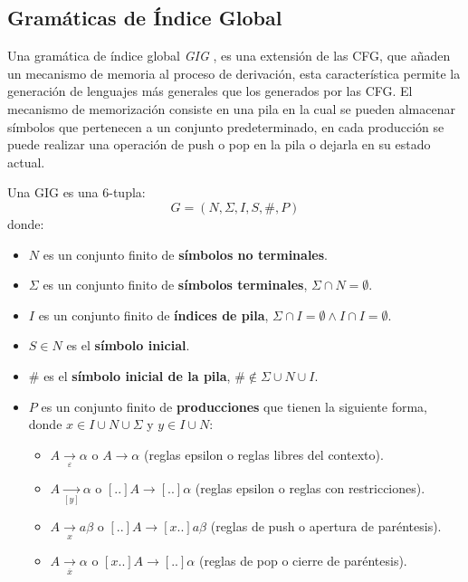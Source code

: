 \documentclass{article}
\begin{document}
\subsection{Gramáticas de Índice Global}

Una gramática de índice global \textit{GIG} \cite{globalIndexLanguages}, es una extensión de las CFG, que añaden un mecanismo 
de memoria al proceso de derivación, esta característica permite la generación de lenguajes más generales que los generados por las CFG.
El mecanismo de memorización consiste en una pila en la cual se pueden almacenar símbolos que pertenecen a un conjunto predeterminado,
en cada producción se puede realizar una operación de push o pop en la pila o dejarla en su estado actual.

Una GIG es una 6-tupla:
$$
      G = (N, \Sigma, I, S, \#, P) 
$$
donde:

\begin{itemize}
      \item $N$ es un conjunto finito de \textbf{símbolos no terminales}.
      \item \( \Sigma \) es un conjunto finito de \textbf{símbolos terminales}, $\Sigma \cap N=\emptyset$.
      \item $I$ es un conjunto finito de \textbf{índices de pila}, $\Sigma \cap I=\emptyset \wedge I \cap I=\emptyset$.
      \item $S\in N$ es el \textbf{símbolo inicial}.
      \item $\#$ es el \textbf{símbolo inicial de la pila}, $\# \notin \Sigma \cup N \cup I$.
      \item $P$ es un conjunto finito de \textbf{producciones} que tienen la siguiente forma, donde $x\in I\cup N\cup \Sigma$ y $y\in I\cup N$:
            \begin{itemize}
                  \item $A \underset{\varepsilon}{\to} \alpha$ o $A \to \alpha$ (reglas epsilon o reglas libres del contexto).
                  \item $A \underset{[y]}{\to}  \alpha$ o $[..]A \to [..]\alpha$ (reglas epsilon o reglas con restricciones).
                  \item $A \underset{x}{\to} a \beta$ o $[..]A \to  [x..]a\beta$ (reglas de push o apertura de paréntesis).
                  \item $A \underset{\overline{x}}{\to} \alpha$ o $[x..]A \to [..]\alpha$ (reglas de pop o cierre de paréntesis).
            \end{itemize}
\end{itemize}
\end{document}

